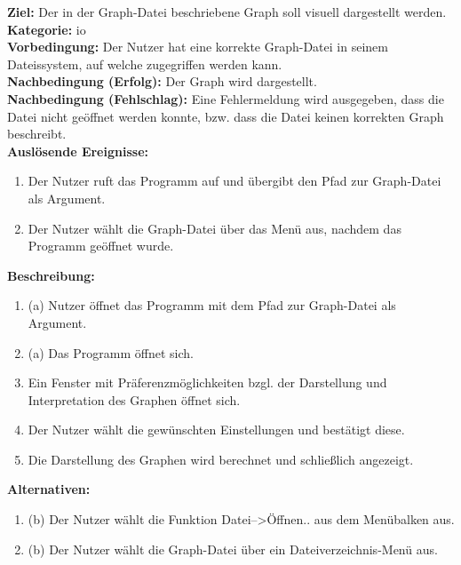 \label{fa:laden}
\textbf{Ziel:} Der in der Graph-Datei beschriebene Graph soll visuell dargestellt werden. \\
\textbf{Kategorie:} \gls{io} \\
\textbf{Vorbedingung:} Der Nutzer hat eine korrekte Graph-Datei in seinem Dateissystem, auf welche zugegriffen werden kann. \\ %
\textbf{Nachbedingung (Erfolg):} Der Graph wird dargestellt. \\
\textbf{Nachbedingung (Fehlschlag):}
Eine Fehlermeldung wird ausgegeben, dass die Datei nicht geöffnet werden konnte, bzw. dass die Datei keinen korrekten Graph beschreibt. \\
\textbf{Auslösende Ereignisse:}
\begin{enumerate}[nolistsep, label=(\alph*)]
  \item Der Nutzer ruft das Programm auf und übergibt den Pfad zur Graph-Datei als Argument.
  \item Der Nutzer wählt die Graph-Datei über das Menü aus, nachdem das Programm geöffnet wurde.
\end{enumerate}
\textbf{Beschreibung:}
\begin{enumerate}[nolistsep]
  \item (a) Nutzer öffnet das Programm mit dem Pfad zur Graph-Datei als Argument.
  \item (a) Das Programm öffnet sich.
  \item Ein Fenster mit Präferenzmöglichkeiten bzgl. der Darstellung und Interpretation des Graphen öffnet sich.
  \item Der Nutzer wählt die gewünschten Einstellungen und bestätigt diese.
  \item Die Darstellung des Graphen wird berechnet und schließlich angezeigt.
\end{enumerate}
\textbf{Alternativen:}
\begin{enumerate}[nolistsep]
  \item (b) Der Nutzer wählt die Funktion Datei-->Öffnen.. aus dem Menübalken aus. %
  \item (b) Der Nutzer wählt die Graph-Datei über ein Dateiverzeichnis-Menü aus.%
\end{enumerate}



